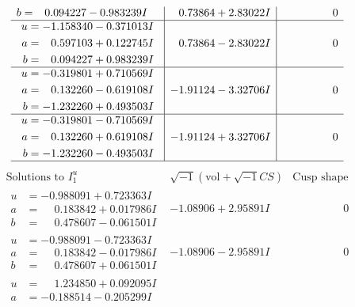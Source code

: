 \documentclass[1p]{elsarticle_modified}
\theoremstyle{definition}
\newcommand{\I}{\sqrt{-1}}
\begin{document}
$$\begin{array}{c|c|c}
\begin{aligned}
b &= \phantom{-}0.094227 - 0.983239 I\end{aligned}
 & \phantom{-}0.73864 + 2.83022 I & \phantom{-0.000000 } 0 \\ \hline\begin{aligned}
u &= -1.158340 - 0.371013 I \\
a &= \phantom{-}0.597103 + 0.122745 I \\
b &= \phantom{-}0.094227 + 0.983239 I\end{aligned}
 & \phantom{-}0.73864 - 2.83022 I & \phantom{-0.000000 } 0 \\ \hline\begin{aligned}
u &= -0.319801 + 0.710569 I \\
a &= \phantom{-}0.132260 - 0.619108 I \\
b &= -1.232260 + 0.493503 I\end{aligned}
 & -1.91124 - 3.32706 I & \phantom{-0.000000 } 0 \\ \hline\begin{aligned}
u &= -0.319801 - 0.710569 I \\
a &= \phantom{-}0.132260 + 0.619108 I \\
b &= -1.232260 - 0.493503 I\end{aligned}
 & -1.91124 + 3.32706 I & \phantom{-0.000000 } 0\\
 \hline 
 \end{array}$$\newpage$$\begin{array}{c|c|c}  
\text{Solutions to }I^u_{1}& \I (\text{vol} + \sqrt{-1}CS) & \text{Cusp shape}\\
 \hline 
\begin{aligned}
u &= -0.988091 + 0.723363 I \\
a &= \phantom{-}0.183842 + 0.017986 I \\
b &= \phantom{-}0.478607 - 0.061501 I\end{aligned}
 & -1.08906 + 2.95891 I & \phantom{-0.000000 } 0 \\ \hline\begin{aligned}
u &= -0.988091 - 0.723363 I \\
a &= \phantom{-}0.183842 - 0.017986 I \\
b &= \phantom{-}0.478607 + 0.061501 I\end{aligned}
 & -1.08906 - 2.95891 I & \phantom{-0.000000 } 0 \\ \hline\begin{aligned}
u &= \phantom{-}1.234850 + 0.092095 I \\
a &= -0.188514 - 0.205299 I \\

\end{aligned}
\end{array}$$
\end{document}
